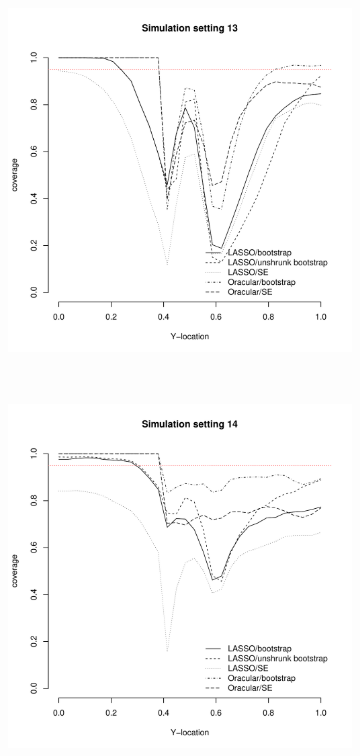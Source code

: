 \documentclass[authoryear, review, 11pt]{elsarticle}
\begin{document}
	
	\begin{figure}
		\centering
		\begin{subfigure}[b]{0.3\textwidth}
			\centering
			\includegraphics[width=\textwidth]{../../figures/simulation/28-13-profile-coverage.pdf}
			\label{fig:gull}
		\end{subfigure}%
        ~ %
		\begin{subfigure}[b]{0.3\textwidth}
			\centering
			\includegraphics[width=\textwidth]{../../figures/simulation/28-14-profile-coverage.pdf}

\end{subfigure}
\end{figure}
\end{document}
